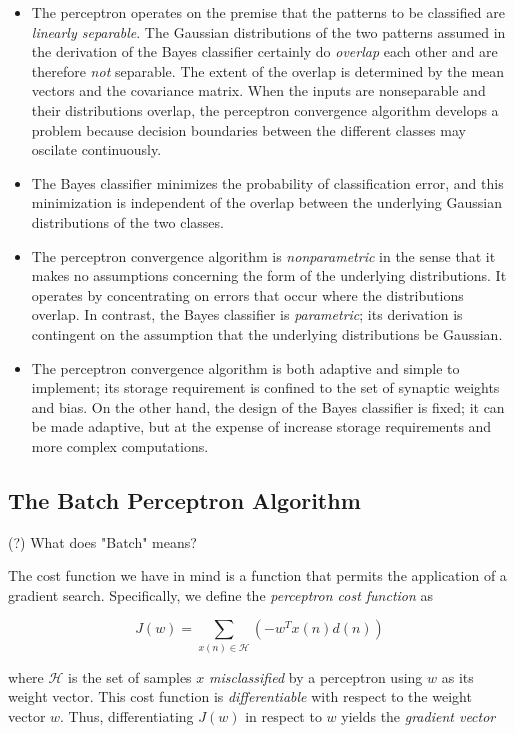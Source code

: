 \documentclass[twocolumn]{article}
\begin{document}
		 \begin{itemize}
			 \item The perceptron operates on the premise that the patterns to be classified are \textit{linearly separable}. The Gaussian distributions of the two patterns assumed in the derivation of the Bayes classifier certainly do \textit{overlap} each other and are therefore \textit{not} separable. The extent of the overlap is determined by the mean vectors and the covariance matrix. When the inputs are nonseparable and their distributions overlap, the perceptron convergence algorithm develops a problem because decision boundaries between the different classes may oscilate continuously.
			 \item The Bayes classifier minimizes the probability of classification error, and this minimization is independent of the overlap between the underlying Gaussian distributions of the two classes.
			 \item The perceptron convergence algorithm is \textit{nonparametric} in the sense that it makes no assumptions concerning the form of the underlying distributions. It operates by concentrating on errors that occur where the distributions overlap. In contrast, the Bayes classifier is \textit{parametric}; its derivation is contingent on the assumption that the underlying distributions be Gaussian.
			 \item The perceptron convergence algorithm is both adaptive and simple to implement; its storage requirement is confined to the set of synaptic weights and bias. On the other hand, the design of the Bayes classifier is fixed; it can be made adaptive, but at the expense of increase storage requirements and more complex computations.
		 \end{itemize}

 \subsection{The Batch Perceptron Algorithm}

	 (?) What does "Batch" means?

	 The cost function we have in mind is a function that permits the application of a gradient search. Specifically, we define the \textit{perceptron cost function} as

	 $$ J(w) = \sum_{x(n) \in \mathcal{H}} ( -w^{T} x(n) d(n)) $$

	 \noindent where $ \mathcal{H} $ is the set of samples $ x $ \textit{misclassified} by a perceptron using $ w $ as its weight vector. This cost function is \textit{differentiable} with respect to the weight vector $ w $. Thus, differentiating $ J(w) $ in respect to $ w $ yields the \textit{gradient vector}
\end{document}

